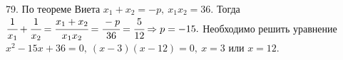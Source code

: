 79. По теореме Виета $x_1+x_2=-p,\ x_1x_2=36.$ Тогда $\cfrac{1}{x_1}+\cfrac{1}{x_2}=\cfrac{x_1+x_2}{x_1x_2}=\cfrac{-p}{36}=\cfrac{5}{12}\Rightarrow p=-15.$ Необходимо решить уравнение $x^2-15x+36=0,\ (x-3)(x-12)=0,\ x=3$ или $x=12.$\\
